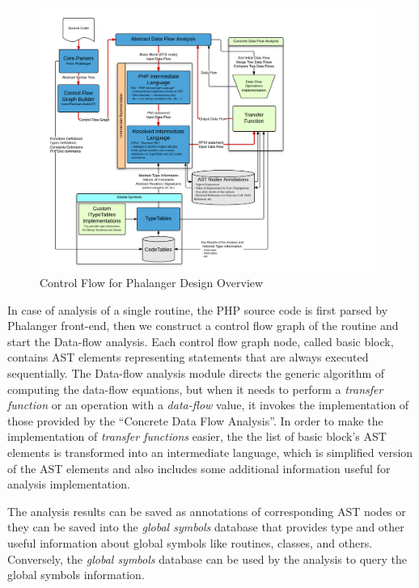 \begin{figure}[h]  
  \centering
    \includegraphics*[width=\textwidth,height=\textheight,keepaspectratio,viewport=0 15 565 590]{img/ControlFlowModules.pdf}  
    \caption{Control Flow for Phalanger Design Overview\label{overalldiagram}}
\end{figure}

    In case of analysis of a single routine, the PHP source code is first 
    parsed by Phalanger front-end, then we construct a control 
    flow graph of the routine and start the Data-flow analysis. 
    Each control flow graph node, called basic block, contains AST 
    elements representing statements that are always executed 
    sequentially. The Data-flow analysis module directs the 
    generic algorithm of computing the data-flow equations, 
    but when it needs to perform a \emph{transfer function} or 
    an operation with a \emph{data-flow} value, it invokes the implementation of 
    those provided by the ``Concrete Data Flow Analysis''. 
    In order to make the implementation of \emph{transfer functions} 
    easier, the the list of basic block's AST elements is 
    transformed into an intermediate language, which is simplified 
    version of the AST elements and also includes some additional 
    information useful for analysis implementation.
    
    The analysis results can be saved as annotations of 
    corresponding AST nodes or they can be saved into the 
    \emph{global symbols} database that provides type and 
    other useful information about global symbols like 
    routines, classes, and others. Conversely, the 
    \emph{global symbols} database can be used by the 
    analysis to query the global symbols information.
    
